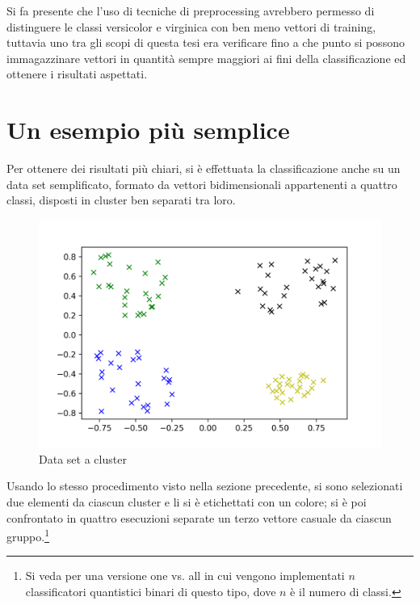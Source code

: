 Si fa presente che l'uso di tecniche di preprocessing avrebbero permesso di 
distinguere le classi versicolor e virginica con ben meno vettori di training, 
tuttavia uno tra gli scopi di questa tesi era verificare fino a che punto si possono 
immagazzinare vettori in quantità sempre maggiori ai fini della classificazione 
ed ottenere i risultati aspettati. 

\section{Un esempio più semplice}

Per ottenere dei risultati più chiari, si è effettuata la classificazione 
anche su un data set semplificato, formato da vettori bidimensionali 
appartenenti a quattro classi, disposti in cluster ben separati tra loro. 

\begin{figure}[h!]
    \centering
    \includegraphics[width=\textwidth]{gfx/cluster/cluster}
    \caption{Data set a cluster}
    \label{fig:cluster}
\end{figure}

Usando lo stesso procedimento visto nella sezione precedente, si sono 
selezionati due elementi da ciascun cluster e li si è etichettati con un colore; 
si è poi confrontato in quattro esecuzioni separate un terzo vettore 
casuale da ciascun gruppo.\footnote{Si veda \cite{anagolum} per una versione 
one vs. all in cui vengono implementati $n$ classificatori quantistici binari di questo tipo, 
dove $n$ è il numero di classi.}

